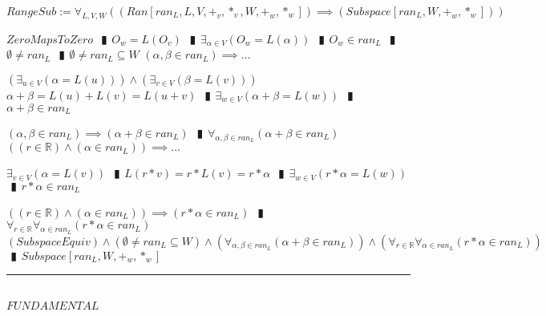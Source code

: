 \documentclass{book}
\newcommand{\abr}{:=}
\newcommand{\pipe}{$\phantom{(}\vrectangleblack\phantom{)}$}
\newcommand{\pr}[1]{\left(#1\right)}
\begin{document}
$RangeSub \abr \forall_{L, V, W}\pr{(Ran[ran_L, L, V, +_v, *_v, W, +_w, *_w]) \implies (Subspace[ran_L, W, +_w, *_w])}$
\begin{enumerate}
  \lit $ZeroMapsToZero$ \pipe $O_w = L(O_v)$ \pipe $\exists_{\alpha \in V}\pr{O_w = L(\alpha)}$ \pipe $O_w \in ran_L$ \pipe $\emptyset \neq ran_L$ \pipe $\emptyset \neq ran_L \subseteq W$
  \lit $(\alpha, \beta \in ran_L) \implies \ldots$
  \begin{enumerate}
    \lit $\pr{\exists_{u \in V}\pr{\alpha = L(u)}} \land \pr{\exists_{v \in V}\pr{\beta = L(v)}}$
    \lit $\alpha + \beta = L(u) + L(v) = L(u + v)$ \pipe $\exists_{w \in V}\pr{\alpha + \beta = L(w)}$ \pipe $\alpha + \beta \in ran_L$
  \end{enumerate}
  \lit $(\alpha, \beta \in ran_L) \implies (\alpha + \beta \in ran_L)$ \pipe $\forall_{\alpha, \beta \in ran_L}(\alpha + \beta \in ran_L)$
  \lit $\pr{(r \in \mathbb{R}) \land (\alpha \in ran_L)} \implies \ldots$
  \begin{enumerate}
    \lit $\exists_{v \in V}\pr{\alpha = L(v)}$ \pipe $L(r * v) = r * L(v) = r * \alpha$ \pipe $\exists_{w \in V}\pr{r * \alpha = L(w)}$ \pipe $r * \alpha \in ran_L$
  \end{enumerate}
  \lit $\pr{(r \in \mathbb{R}) \land (\alpha \in ran_L)} \implies (r * \alpha \in ran_L)$ \pipe $\forall_{r \in \mathbb{R}} \forall_{\alpha \in ran_L}(r * \alpha \in ran_L)$
  \lit $(SubspaceEquiv) \land (\emptyset \neq ran_L \subseteq W) \land \pr{\forall_{\alpha, \beta \in ran_L}(\alpha + \beta \in ran_L)} \land \pr{\forall_{r \in \mathbb{R}} \forall_{\alpha \in ran_L}(r * \alpha \in ran_L)}$ \pipe $Subspace[ran_L, W, +_w, *_w]$
\end{enumerate} \vspace{.75mm} \hrule \vspace{.75mm} \ \\ 

$FUNDAMENTAL$






\end{document}
